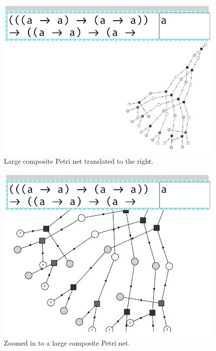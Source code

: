 \documentclass[11pt,openright,hidelinks,a4paper]{article}
\begin{document}
\begin{figure}[H]
\begin{center}
\includegraphics[scale=0.45]{righttranslate}
\end{center}
\caption{Large composite Petri net translated to the right.}
\label{fig:righttranslate}
\end{figure}

\begin{figure}[H]
\begin{center}
\includegraphics[scale=0.45]{zoomedin}
\end{center}
\caption{Zoomed in to a large composite Petri net.}
\label{fig:zoomedin}
\end{figure}
\end{document}

